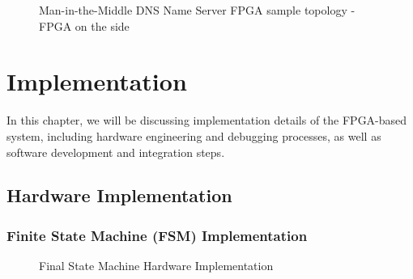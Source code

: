 \documentclass[a4paper]{report}
\begin{document}
\begin{figure}[H]
  \caption{Man-in-the-Middle DNS Name Server FPGA sample topology - FPGA on the side}
  \label{fig:dns-flood-man-in-the-middle-asic}
\end{figure}

\chapter{Implementation}

In this chapter, we will be discussing implementation details of the FPGA-based system, including hardware engineering and debugging processes, as well as software development and integration steps.

\section{Hardware Implementation}
\label{section:implementation-hardware-implementation}

\subsection{Finite State Machine (FSM) Implementation}

\begin{figure}[h!]
  \caption{Final State Machine Hardware Implementation}
  \label{fig:fsm-impl}
\end{figure}
\end{document}
